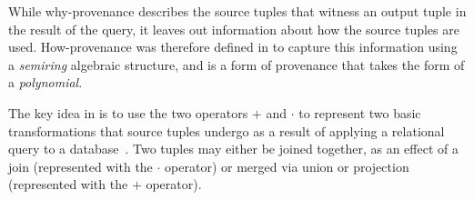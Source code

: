 While why-provenance describes the source tuples that witness an output tuple in the result of the query, it leaves out  information about how the source tuples are used.
How-provenance was therefore defined in \citep{howProvenanceGreen} to capture this information using a \emph{semiring} algebraic structure, and is a form of provenance that takes the form of a \emph{polynomial}.

The key idea in \citet{howProvenanceGreen} is to use the two operators $+$ and $\cdot$ to represent two basic transformations that source tuples undergo as a result of applying a relational query to a database~\citep{CheneyProvSurvey}. 
Two tuples may either be joined together, as an effect of a join (represented with the $\cdot$ operator) or merged via union or projection (represented with the $+$ operator).


